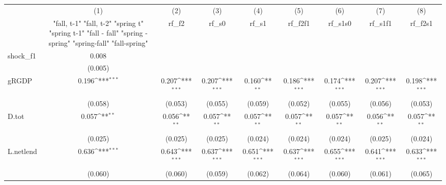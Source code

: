 {
\def\sym#1{\ifmmode^{#1}\else\(^{#1}\)\fi}
\begin{tabular}{l*{8}{c}}
\toprule
            &\multicolumn{1}{c}{(1)}&\multicolumn{1}{c}{(2)}&\multicolumn{1}{c}{(3)}&\multicolumn{1}{c}{(4)}&\multicolumn{1}{c}{(5)}&\multicolumn{1}{c}{(6)}&\multicolumn{1}{c}{(7)}&\multicolumn{1}{c}{(8)}\\
            &\multicolumn{1}{c}{  "fall, t-1" "fall, t-2" "spring t" "spring t-1"  "fall - fall" "spring - spring" "spring-fall" "fall-spring" }&\multicolumn{1}{c}{rf\_f2}&\multicolumn{1}{c}{rf\_s0}&\multicolumn{1}{c}{rf\_s1}&\multicolumn{1}{c}{rf\_f2f1}&\multicolumn{1}{c}{rf\_s1s0}&\multicolumn{1}{c}{rf\_s1f1}&\multicolumn{1}{c}{rf\_f2s1}\\
\midrule
shock\_f1    &       0.008         &                     &                     &                     &                     &                     &                     &                     \\
            &     (0.005)         &                     &                     &                     &                     &                     &                     &                     \\
\addlinespace
gRGDP       &       0.196\sym{***}&       0.207\sym{***}&       0.207\sym{***}&       0.160\sym{**} &       0.186\sym{***}&       0.174\sym{***}&       0.207\sym{***}&       0.198\sym{***}\\
            &     (0.058)         &     (0.053)         &     (0.055)         &     (0.059)         &     (0.052)         &     (0.055)         &     (0.056)         &     (0.053)         \\
\addlinespace
D.tot       &       0.057\sym{**} &       0.056\sym{**} &       0.057\sym{**} &       0.057\sym{**} &       0.057\sym{**} &       0.057\sym{**} &       0.056\sym{**} &       0.057\sym{**} \\
            &     (0.025)         &     (0.025)         &     (0.025)         &     (0.024)         &     (0.024)         &     (0.024)         &     (0.025)         &     (0.024)         \\
\addlinespace
L.netlend   &       0.636\sym{***}&       0.643\sym{***}&       0.637\sym{***}&       0.651\sym{***}&       0.637\sym{***}&       0.655\sym{***}&       0.641\sym{***}&       0.633\sym{***}\\
            &     (0.060)         &     (0.060)         &     (0.059)         &     (0.062)         &     (0.064)         &     (0.060)         &     (0.061)         &     (0.065)         \\

\end{tabular}}
